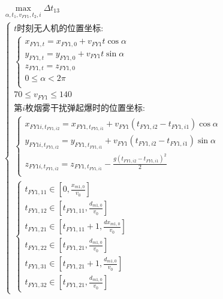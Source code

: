 \documentclass[../main.tex]{subfiles}
\begin{document}
\begin{align}
  \begin{array}{c}
\underset{\alpha ,t_1,v_{FY1},t_2,i}{\max}\Delta t_{13}
  \\
\left\{ \begin{array}{l}
	t\text{时刻无人机的位置坐标:}\\
	\left\{ \begin{array}{l}
	x_{FY1,t}=x_{FY1,0}+v_{FY1}t\cos \alpha \\
	y_{FY1,t}=y_{FY1,0}+v_{FY1}t\sin \alpha \\
	z_{FY1,t}=z_{FY1,0}\\
	0\leq \alpha < 2\pi \\
\end{array} \right.\\
  70 \leq v_{FY1} \leq 140\\
	\text{第$i$枚烟雾干扰弹起爆时的位置坐标:}\\
	\left\{ \begin{array}{l}
	x_{FY1i,t_{FY1,i2}}=x_{FY1,t_{FY1,i1}}+v_{FY1}\left( t_{FY1,i2}-t_{FY1,i1} \right) \cos \alpha\\
	y_{FY1i,t_{FY1,i2}}=y_{FY1,t_{FY1,i1}}+v_{FY1}\left( t_{FY1,i2}-t_{FY1,i1} \right) \sin \alpha\\
	z_{FY1i,t_{FY1,i2}}=z_{FY1,t_{FY1,i1}}-\frac{g\left( t_{FY1,i2}-t_{FY1,i1} \right) ^2}{2}\\
\end{array} \right. \\
	\left\{ \begin{array}{l}
	t_{FY1,11}\in \left[ 0, \frac{x_{m1,0}}{v_0} \right]
	\\t_{FY1,12}\in \left[ t_{FY1,11}, \frac{d_{m1,0}}{v_0} \right]
	\\t_{FY1,21}\in \left[ t_{FY1,11}+1, \frac{dx_{m1,0}}{v_0} \right]
	\\t_{FY1,22}\in \left[ t_{FY1,21}, \frac{d_{m1,0}}{v_0} \right]
	\\t_{FY1,31}\in \left[ t_{FY1,21}+1, \frac{d_{m1,0}}{v_0} \right]
	\\t_{FY1,32}\in \left[ t_{FY1,21}, \frac{d_{m1,0}}{v_0} \right]
\end{array} \right. 
\end{array} \right.  
\end{array}
\end{align}

  
\end{document}
